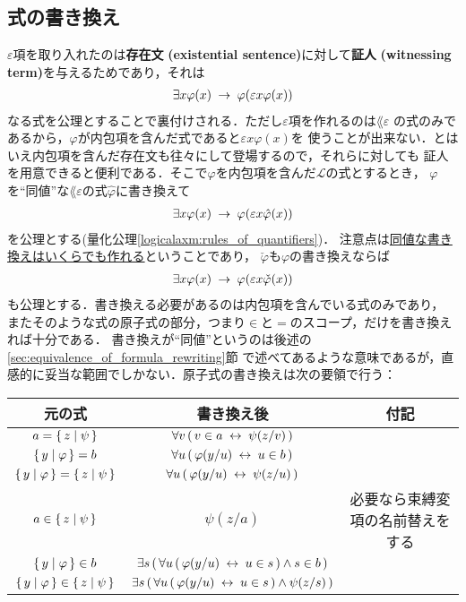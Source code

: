 \subsection{式の書き換え}
\label{subsec:formula_rewriting}
	$\varepsilon$項を取り入れたのは{\bf 存在文}
	{\bf (existential sentence)}に対して{\bf 証人}
	{\bf (witnessing term)}を与えるためであり，それは
	\begin{align}
		\exists x \varphi(x) \hspace{0.25em}\rightarrow\hspace{0.25em} \varphi(\varepsilon x \varphi(x))
	\end{align}
	なる式を公理とすることで裏付けされる．ただし$\varepsilon$項を作れるのは$\lang{\varepsilon}$
	の式のみであるから，$\varphi$が内包項を含んだ式であると$\varepsilon x \varphi(x)$を
	使うことが出来ない．とはいえ内包項を含んだ存在文も往々にして登場するので，それらに対しても
	証人を用意できると便利である．そこで$\varphi$を内包項を含んだ$\mathcal{L}$の式とするとき，
	$\varphi$を``同値''な$\lang{\varepsilon}$の式$\hat{\varphi}$に書き換えて
	\begin{align}
		\exists x \varphi(x) \hspace{0.25em}\rightarrow\hspace{0.25em} \varphi(\varepsilon x \hat{\varphi}(x))
	\end{align}
	を公理とする(量化公理\ref{logicalaxm:rules_of_quantifiers})．
	注意点は\underline{同値な書き換えはいくらでも作れる}ということであり，
	$\check{\varphi}$も$\varphi$の書き換えならば
	\begin{align}
		\exists x \varphi(x) \hspace{0.25em}\rightarrow\hspace{0.25em} \varphi(\varepsilon x \check{\varphi}(x))
	\end{align}
	も公理とする．書き換える必要があるのは内包項を含んでいる式のみであり，
	またそのような式の原子式の部分，つまり$\in$と$=$のスコープ，だけを書き換えれば十分である．
	書き換えが``同値''というのは後述の\ref{sec:equivalence_of_formula_rewriting}節
	で述べてあるような意味であるが，直感的に妥当な範囲でしかない．原子式の書き換えは次の要領で行う：
	
	\begin{table}[H]
		\begin{center}
		\begin{tabular}{c|c|c}
			元の式 & 書き換え後 & 付記 \\ \hline \hline
			$a = \{\, z \mid \psi\, \}$ & $\forall v\, (\, v \in a \hspace{0.25em}\leftrightarrow\hspace{0.25em} \psi(z/v)\, )$ & \\ \hline
			$\{\, y \mid \varphi\, \} = b$ & $\forall u\, (\, \varphi(y/u) \hspace{0.25em}\leftrightarrow\hspace{0.25em} u \in b\, )$ & \\ \hline
			$\{\, y \mid \varphi\, \} = \{\, z \mid \psi\, \}$ & $\forall u\, (\, \varphi(y/u) \hspace{0.25em}\leftrightarrow\hspace{0.25em} \psi(z/u)\, )$ & \\ \hline
			$a \in \{\, z \mid \psi\, \}$ & $\psi(z/a)$ & 必要なら束縛変項の名前替えをする \\ \hline
			$\{\, y \mid \varphi\, \} \in b$ & $\exists s\, (\, \forall u\, (\, \varphi(y/u) \hspace{0.25em}\leftrightarrow\hspace{0.25em} u \in s\, ) \wedge s \in b\, )$ & \\ \hline
			$\{\, y \mid \varphi\, \} \in \{\, z \mid \psi\, \}$ & $\exists s\, (\, \forall u\, (\, \varphi(y/u) \hspace{0.25em}\leftrightarrow\hspace{0.25em} u \in s\, ) \wedge \psi(z/s)\, )$ & \\ \hline
		\end{tabular}
		\end{center}
	\end{table}
	
